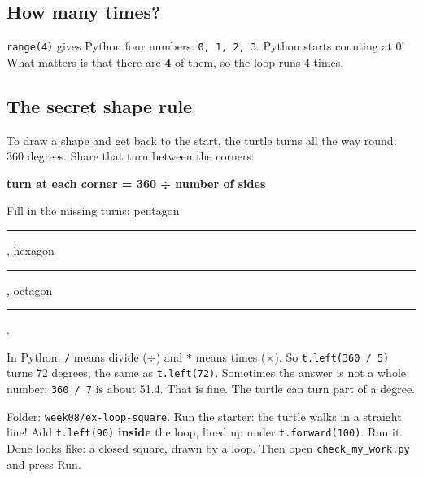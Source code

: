 \subsection{How many times?}
\texttt{range(4)} gives Python four numbers: \texttt{0, 1, 2, 3}. Python starts counting at 0! What matters is that there are \textbf{4} of them, so the loop runs 4 times.

\subsection{The secret shape rule}
To draw a shape and get back to the start, the turtle turns all the way round: 360 degrees. Share that turn between the corners:
\begin{center}
\textbf{turn at each corner = 360 ÷ number of sides}
\end{center}
\begin{center}
\end{center}
Fill in the missing turns: pentagon \rule{1.2cm}{0.4pt}, hexagon \rule{1.2cm}{0.4pt}, octagon \rule{1.2cm}{0.4pt}.

\begin{tip}
In Python, \texttt{/} means divide (÷) and \texttt{*} means times (×). So \texttt{t.left(360 / 5)} turns 72 degrees, the same as \texttt{t.left(72)}. Sometimes the answer is not a whole number: \texttt{360 / 7} is about 51.4. That is fine. The turtle can turn part of a degree.
\end{tip}

\begin{exercise}
Folder: \texttt{week08/ex-loop-square}. Run the starter: the turtle walks in a straight line! Add \texttt{t.left(90)} \textbf{inside} the loop, lined up under \texttt{t.forward(100)}. Run it.
Done looks like: a closed square, drawn by a loop. Then open \texttt{check\_my\_work.py} and press Run.
\end{exercise}

